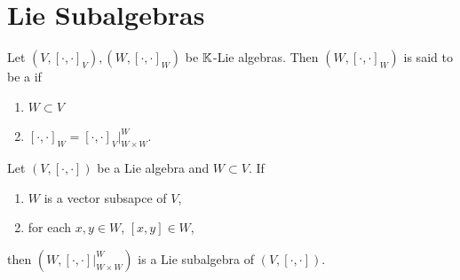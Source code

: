 \documentclass{book}
\begin{document}
\section{Lie Subalgebras}

\begin{defn} 
	Let $(V, [\cdot, \cdot]_V), (W, [\cdot, \cdot]_W)$ be $\mathbb{K}$-Lie algebras. Then $(W, [\cdot, \cdot]_W)$ is said to be a  if 
	\begin{enumerate}
		\item $W \subset V$
		\item $[\cdot, \cdot]_W = [\cdot, \cdot]_V|_{W \times W}^W$. 
	\end{enumerate}
\end{defn}

\begin{ex} 
	Let $(V, [\cdot, \cdot])$ be a Lie algebra and $W \subset V$. If 
	\begin{enumerate}[label=(\alph*)]
		\item $W$ is a vector subsapce of $V$, \label{ex:lie_alg_subalg:0002_alph1}
		\item for each $x, y \in W$, $[x, y] \in W$, \label{ex:lie_alg_subalg:0002_alph2}
	\end{enumerate} 
	then $(W, [\cdot, \cdot]|^W_{W \times W})$ is a Lie subalgebra of $(V, [\cdot, \cdot])$.
\end{ex}
\end{document}
